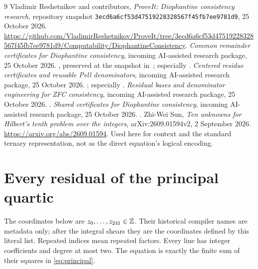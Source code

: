 \documentclass[11pt,letterpaper]{article}
\theoremstyle{remark}\newtheorem{remark}[theorem]{Remark}
\newcommand{\Z}{\mathbb Z}\newcommand{\N}{\mathbb N}
\begin{document}
\begingroup\raggedright
\begin{thebibliography}{9}
 Vladimir Reshetnikov and contributors, \emph{ProveIt: Diophantine consistency research}, repository snapshot \texttt{3ecd6a6cf53d47519228328567f45fb7ee9781d9}, 25 October 2026. \url{https://github.com/VladimirReshetnikov/ProveIt/tree/3ecd6a6cf53d47519228328567f45fb7ee9781d9/Computability/DiophantineConsistency}.
 \emph{Common remainder certificates for Diophantine consistency}, incoming AI-assisted research package, 25 October 2026. , preserved at the snapshot in~\cite{repo}; especially .
 \emph{Centered residue certificates and reusable Pell denominators}, incoming AI-assisted research package, 25 October 2026. ; especially .
 \emph{Residual bases and denominator engineering for ZFC consistency}, incoming AI-assisted research package, 25 October 2026. .
 \emph{Shared certificates for Diophantine consistency}, incoming AI-assisted research package, 25 October 2026. .
 Zhi-Wei Sun, \emph{Ten unknowns for Hilbert's tenth problem over the integers}, arXiv:2609.01594v2, 2 September 2026. \url{https://arxiv.org/abs/2609.01594}. Used here for context and the standard ternary representation, not as the direct equation's logical encoding.
\end{thebibliography}
\endgroup

\clearpage\appendix
\section{Every residual of the principal quartic}\label{app:residuals}
The coordinates below are $z_0,\ldots,z_{\LastVariable}\in\Z$. Their historical compiler names are metadata only; after the integral shears they are the coordinates defined by this literal list. Repeated indices mean repeated factors. Every line has integer coefficients and degree at most two. The equation is exactly the finite sum of their squares in \eqref{eq:principal}.


\end{document}
